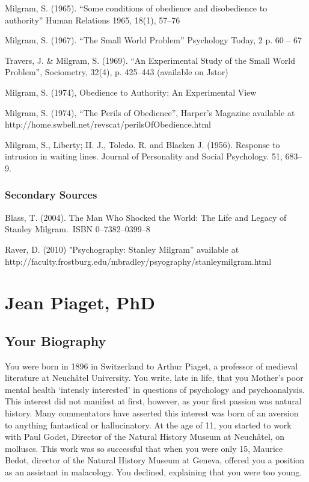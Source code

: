 \begin{refsection}
Milgram, S. (1965). “Some conditions of obedience and disobedience to authority” Human Relations 1965, 18(1), 57--76

Milgram, S. (1967). ``The Small World Problem'' Psychology Today, 2 p. 60 – 67

Travers, J. \& Milgram, S. (1969). “An Experimental Study of the Small World Problem”, Sociometry, 32(4), p. 425--443 (available on Jstor)

Milgram, S. (1974), Obedience to Authority; An Experimental View

Milgram, S. (1974), ``The Perils of Obedience'', Harper's Magazine available at http:\slash \slash home.swbell.net\slash revscat\slash perilsOfObedience.html

Milgram, S., Liberty; II. J., Toledo. R. and Blacken J. (1956). Response to intrusion in waiting lines. Journal of Personality and Social Psychology. 51, 683--9.

\subsection{Secondary Sources}
\label{secondarysources}

Blass, T. (2004). The Man Who Shocked the World: The Life and Legacy of Stanley Milgram. ISBN 0--7382--0399--8

Raver, D. (2010) "Psychography: Stanley Milgram” available at http:\slash \slash faculty.frostburg.edu\slash mbradley\slash psyography\slash stanleymilgram.html

\chapter{Jean Piaget, PhD}
\label{jeanpiagetphd}

\section{Your Biography}
\label{yourbiography}

You were born in 1896 in Switzerland to Arthur Piaget, a professor of medieval literature at Neuchâtel University. You write, late in life, that you Mother's poor mental health `intensly interested' in questions of psychology and psychoanalysis. This interest did not manifest at first, however, as your first passion was natural history. Many commentators have asserted this interest was born of an aversion to anything fantastical or hallucinatory. At the age of 11, you started to work with Paul Godet, Director of the Natural History Museum at Neuchâtel, on molluscs. This work was so successful that when you were only 15, Maurice Bedot, director of the Natural History Museum at Geneva, offered you a position as an assistant in malacology. You declined, explaining that you were too young.


\end{refsection}

